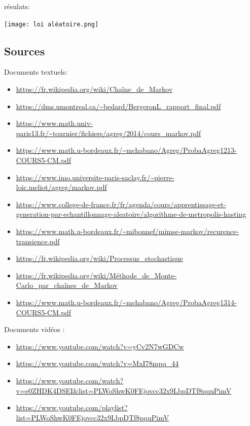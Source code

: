 \documentclass{article}
\begin{document}
résulats:

\texttt{[image: loi aléatoire.png]}


















\newpage

\subsection{Sources}



Documents textuels:
\begin{itemize}
\item \url{https://fr.wikipedia.org/wiki/Chaîne_de_Markov}
\item \url{https://dms.umontreal.ca/~bedard/BergeronL_rapport_final.pdf}
\item \url{https://www.math.univ-paris13.fr/~tournier/fichiers/agreg/2014/cours_markov.pdf}
\item \url{https://www.math.u-bordeaux.fr/~mchabano/Agreg/ProbaAgreg1213-COURS5-CM.pdf}
\item \url{https://www.imo.universite-paris-saclay.fr/~pierre-loic.meliot/agreg/markov.pdf}
\item \url{https://www.college-de-france.fr/fr/agenda/cours/apprentissage-et-generation-par-echantillonnage-aleatoire/algorithme-de-metropolis-hasting}
\item \url{https://www.math.u-bordeaux.fr/~mibonnef/mimse-markov/recurence-transience.pdf}
\item \url{https://fr.wikipedia.org/wiki/Processus_stochastique}
\item \url{https://fr.wikipedia.org/wiki/Méthode_de_Monte-Carlo_par_chaînes_de_Markov}
\item \url{https://www.math.u-bordeaux.fr/~mchabano/Agreg/ProbaAgreg1314-COURS5-CM.pdf} \\
\end{itemize}

Documents vidéos :
\begin{itemize}
\item \url{https://www.youtube.com/watch?v=yCv2N7wGDCw}
\item \url{https://www.youtube.com/watch?v=MxI78mpq_44}
\item \url{https://www.youtube.com/watch?v=e0ZHDK4DSEI&list=PLWoShwK0FEjovcc32x9LbpDTf8pquPimV}
\item \url{https://www.youtube.com/playlist?list=PLWoShwK0FEjovcc32x9LbpDTf8pquPimV} \\
\end{itemize}
\end{document}
